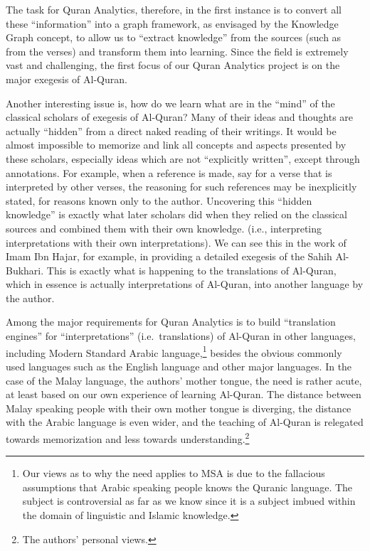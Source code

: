 \documentclass[
]{article}
\begin{document}
The task for Quran Analytics, therefore, in the first instance is to convert all these ``information'' into a graph framework, as envisaged by the Knowledge Graph concept, to allow us to ``extract knowledge'' from the sources (such as from the verses) and transform them into learning. Since the field is extremely vast and challenging, the first focus of our Quran Analytics project is on the major exegesis of Al-Quran.

Another interesting issue is, how do we learn what are in the ``mind'' of the classical scholars of exegesis of Al-Quran? Many of their ideas and thoughts are actually ``hidden'' from a direct naked reading of their writings. It would be almost impossible to memorize and link all concepts and aspects presented by these scholars, especially ideas which are not ``explicitly written'', except through annotations. For example, when a reference is made, say for a verse that is interpreted by other verses, the reasoning for such references may be inexplicitly stated, for reasons known only to the author. Uncovering this ``hidden knowledge'' is exactly what later scholars did when they relied on the classical sources and combined them with their own knowledge. (i.e., interpreting interpretations with their own interpretations). We can see this in the work of Imam Ibn Hajar, for example, in providing a detailed exegesis of the Sahih Al-Bukhari. This is exactly what is happening to the translations of Al-Quran, which in essence is actually interpretations of Al-Quran, into another language by the author.

Among the major requirements for Quran Analytics is to build ``translation engines'' for ``interpretations'' (i.e.~translations) of Al-Quran in other languages, including Modern Standard Arabic language,\footnote{Our views as to why the need applies to MSA is due to the fallacious assumptions that Arabic speaking people knows the Quranic language. The subject is controversial as far as we know since it is a subject imbued within the domain of linguistic and Islamic knowledge.} besides the obvious commonly used languages such as the English language and other major languages. In the case of the Malay language, the authors' mother tongue, the need is rather acute, at least based on our own experience of learning Al-Quran. The distance between Malay speaking people with their own mother tongue is diverging, the distance with the Arabic language is even wider, and the teaching of Al-Quran is relegated towards memorization and less towards understanding.\footnote{The authors' personal views.}
\end{document}
